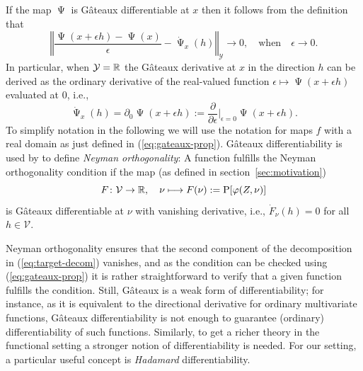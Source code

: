 \documentclass[a4,danish]{article}
\DeclareMathOperator{\TT}{\Psi}
\begin{document}
If the map $\TT$ is Gâteaux differentiable at $x$ then it follows from the definition that
\begin{equation}
  \label{eq:1}
    \left\Vert
      \frac{\TT(x + \epsilon h) - \TT(x)}{\epsilon} - \dot{\TT}_x(h)
    \right\Vert_{\mathcal{Y}} \longrightarrow 0,
    \quad \text{when} \quad \epsilon \longrightarrow 0.
\end{equation}
In particular, when $\mathcal{Y} = \mathbb{R}$ the Gâteaux derivative at $x$ in the direction $h$ can be
derived as the ordinary derivative of the real-valued function
$\epsilon \mapsto \TT(x + \epsilon h)$ evaluated at 0, i.e.,
\begin{equation}
  \label{eq:gateaux-prop}
  \dot{\TT}_x(h) = \partial_0 \TT(x + \epsilon h)
  := \frac{\partial}{\partial \epsilon} \bigg \vert_{\epsilon=0} \TT(x + \epsilon h).
\end{equation}
To simplify notation in the following we will use the notation
 for maps $f$ with a real domain
as just defined in (\ref{eq:gateaux-prop}). Gâteaux differentiability
is used by \cite{chernozhukov2018double} to define \textit{Neyman
  orthogonality}: A function  fulfills the Neyman orthogonality
condition  if the map (as
defined in section~\ref{sec:motivation})
\begin{equation*}
  F \colon \mathcal{V} \rightarrow \mathbb{R}, \quad \nu \longmapsto F(\nu) :=\mathrm{{P}}[\varphi(Z, \nu)]
\end{equation*}
is Gâteaux differentiable at $\nu$ with vanishing derivative, i.e., $\dot{F}_{\nu}(h) = 0$ for all
$h \in \mathcal{V}$.

Neyman orthogonality ensures that the second component of the decomposition in
(\ref{eq:target-decom}) vanishes, and as the condition can be checked using (\ref{eq:gateaux-prop})
it is rather straightforward to verify that a given function fulfills the condition. Still, Gâteaux
is a weak form of differentiability; for instance, as it is equivalent to the directional derivative
for ordinary multivariate functions, Gâteaux differentiability is not enough to guarantee (ordinary)
differentiability of such functions. Similarly, to get a richer theory in the functional setting a
stronger notion of differentiability is needed. For our setting, a particular useful concept is
\textit{Hadamard} differentiability.
\end{document}
